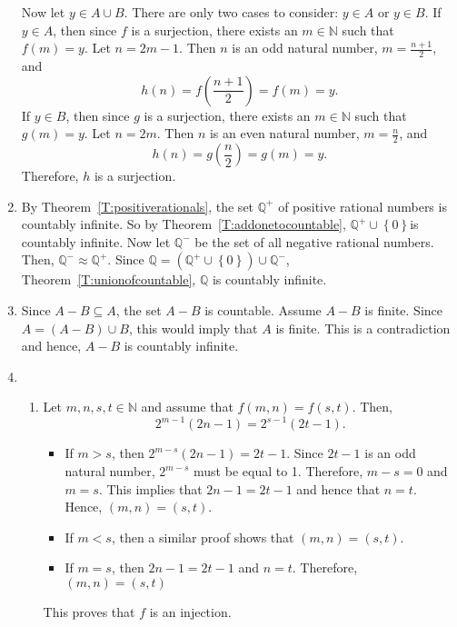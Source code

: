 \begin{enumerate}
Now let $y \in A \cup B$.  There are only two cases to consider:  $y \in A$ or $y \in B$.  If 
$y \in A$, then since $f$ is a surjection, there exists an $m \in \mathbb{N}$ such that 
$f \left( m \right) = y$.  Let $n = 2m - 1$.  Then $n$ is an odd natural number, 
$m = \frac{n + 1}{2}$,  and
\[
h \left( n \right) = f \left( \frac{n + 1}{2} \right) = f \left( m \right) = y.
\]
If $y \in B$, then since $g$ is a surjection, there exists an $m \in \mathbb{N}$ such that 
$g \left( m \right) = y$.  Let $n = 2m$.  Then $n$ is an even natural number, 
$m = \frac{n}{2}$,  and
\[
h \left( n \right) = g \left( \frac{n}{2} \right) = g \left( m \right) = y.
\]
Therefore, $h$ is a surjection.

\item By Theorem~\ref{T:positiverationals}, the set $\mathbb{Q}^+$ of positive rational numbers is countably infinite. So by Theorem~\ref{T:addonetocountable}, 
$\mathbb{Q}^+ \cup \left\{ 0 \right\}$is countably infinite.  Now let $\mathbb{Q}^-$ be the set of all negative rational numbers.  Then, $\mathbb{Q}^- \approx \mathbb{Q}^+$.  Since 
$\mathbb{Q} = \left( \mathbb{Q}^+ \cup \left\{ 0 \right\} \right) \cup \mathbb{Q}^-$, 
Theorem~\ref{T:unionofcountable}, $\mathbb{Q}$ is countably infinite.

\item Since $A - B \subseteq A$, the set $A - B$ is countable.  Assume $A - B$ is finite.  Since 
$A = \left( A - B \right) \cup B$, this would imply that $A$ is finite.  This is a contradiction and hence, $A - B$ is countably infinite.

\item \begin{enumerate}
\item Let $m, n, s, t \in \mathbb{N}$ and assume that 
$f \left( m, n \right) = f \left( s, t \right)$.  Then, 
\[
2^{m - 1} \left( 2n - 1 \right) = 2^{s - 1} \left( 2t - 1 \right).
\]
\begin{itemize}
\item If $m >s$, then $2^{m - s} \left( 2n - 1 \right) = 2t - 1$.  Since $2t - 1$ is an odd natural number, $2^{m - s}$ must be equal to 1.  Therefore, $m - s = 0$ and $m = s$.  This implies that $2n - 1 = 2t - 1$ and hence that $n = t$.  Hence, 
$\left( m, n \right) = \left( s, t \right)$.

\item If $m < s$, then a similar proof shows that $\left( m, n \right) = \left( s, t \right)$.

\item If $m = s$, then $2n - 1 = 2t - 1$ and $n = t$.  Therefore, 
$\left( m, n \right) = \left( s, t \right)$
\end{itemize}
This proves that $f$ is an injection.


\end{enumerate}
\end{enumerate}
